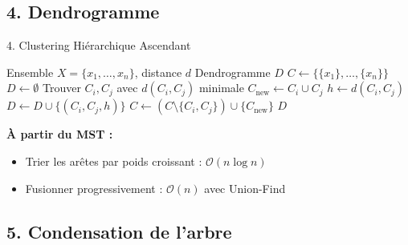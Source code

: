 \documentclass[aspectratio=139,8pt]{beamer}
\begin{document}
\subsection{4. Dendrogramme}

\begin{frame}{4. Clustering Hiérarchique Ascendant}
\begin{algorithm}[H]
\caption{Construction du dendrogramme}
\begin{algorithmic}
\REQUIRE Ensemble $X=\{x_1,\ldots,x_n\}$, distance $d$
\ENSURE Dendrogramme $D$
\STATE $C \leftarrow \{\{x_1\},\ldots,\{x_n\}\}$
\STATE $D \leftarrow \emptyset$
\STATE Trouver $C_i, C_j$ avec $d(C_i, C_j)$ minimale
\STATE $C_{\text{new}} \leftarrow C_i \cup C_j$
\STATE $h \leftarrow d(C_i, C_j)$ 
\STATE $D \leftarrow D \cup \{(C_i, C_j, h)\}$
\STATE $C \leftarrow (C \setminus \{C_i, C_j\}) \cup \{C_{\text{new}}\}$
\ENDWHILE
\RETURN $D$
\end{algorithmic}
\end{algorithm}

\textbf{À partir du MST :}
\begin{itemize}
\item Trier les arêtes par poids croissant : $\mathcal{O}(n \log n)$
\item Fusionner progressivement : $\mathcal{O}(n)$ avec Union-Find
\end{itemize}
\end{frame}

\subsection{5. Condensation de l'arbre}
\end{document}
